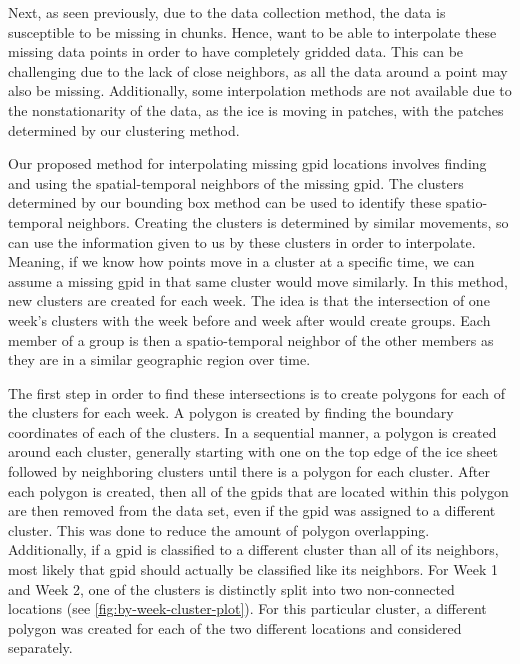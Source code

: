 \documentclass[12pt]{article}
\begin{document}
Next, as seen previously, due to the data collection method, the data is
susceptible to be missing in chunks. Hence, want to be able to
interpolate these missing data points in order to have completely
gridded data. This can be challenging due to the lack of close
neighbors, as all the data around a point may also be missing.
Additionally, some interpolation methods are not available due to the
nonstationarity of the data, as the ice is moving in patches, with the
patches determined by our clustering method.

Our proposed method for interpolating missing gpid locations involves
finding and using the spatial-temporal neighbors of the missing gpid.
The clusters determined by our bounding box method can be used to
identify these spatio-temporal neighbors. Creating the clusters is
determined by similar movements, so can use the information given to us
by these clusters in order to interpolate. Meaning, if we know how
points move in a cluster at a specific time, we can assume a missing
gpid in that same cluster would move similarly. In this method, new
clusters are created for each week. The idea is that the intersection of
one week's clusters with the week before and week after would create
groups. Each member of a group is then a spatio-temporal neighbor of the
other members as they are in a similar geographic region over time.

The first step in order to find these intersections is to create
polygons for each of the clusters for each week. A polygon is created by
finding the boundary coordinates of each of the clusters. In a
sequential manner, a polygon is created around each cluster, generally
starting with one on the top edge of the ice sheet followed by
neighboring clusters until there is a polygon for each cluster. After
each polygon is created, then all of the gpids that are located within
this polygon are then removed from the data set, even if the gpid was
assigned to a different cluster. This was done to reduce the amount of
polygon overlapping. Additionally, if a gpid is classified to a
different cluster than all of its neighbors, most likely that gpid
should actually be classified like its neighbors. For Week 1 and Week 2,
one of the clusters is distinctly split into two non-connected locations
(see \cref{fig:by-week-cluster-plot}). For this particular cluster, a
different polygon was created for each of the two different locations
and considered separately.
\end{document}
